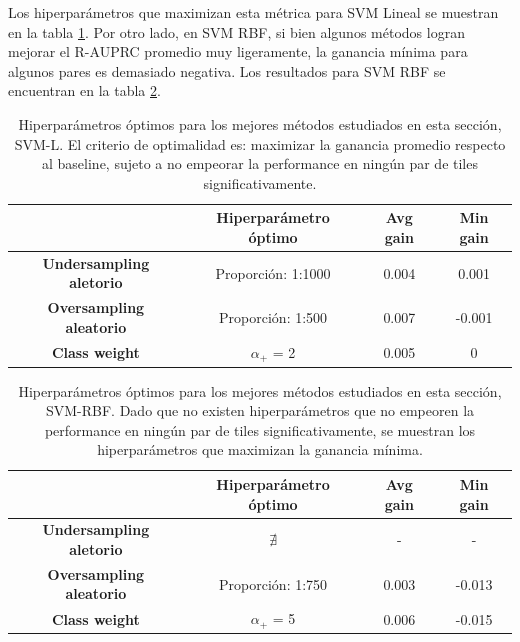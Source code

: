 Los hiperparámetros que maximizan esta métrica para SVM Lineal se muestran en la tabla \ref{tab:best_hyp_svml}. Por otro lado, en SVM RBF, si bien algunos métodos logran mejorar el R-AUPRC promedio muy ligeramente, la ganancia mínima para algunos pares es demasiado negativa. Los resultados para SVM RBF se encuentran en la tabla \ref{tab:best_hyp_svmk}. 


\begin{table}[ht]
\centering
\begin{tabular}{c|c|c|c|}
\cline{2-4}
\textbf{}                                             & \textbf{Hiperparámetro óptimo} & \textbf{Avg gain} & \textbf{Min gain} \\ \hline
\multicolumn{1}{|c|}{\textbf{Undersampling aletorio}} & Proporción: 1:1000       & 0.004             & 0.001            \\ \hline
\multicolumn{1}{|c|}{\textbf{Oversampling aleatorio}} & Proporción: 1:500        & 0.007             & -0.001            \\ \hline
\multicolumn{1}{|c|}{\textbf{Class weight}}           & $\alpha_+$ = 2           & 0.005             & 0            \\ \hline
\end{tabular}
\caption{Hiperparámetros óptimos para los mejores métodos estudiados en esta sección, SVM-L. El criterio de optimalidad es: maximizar la ganancia promedio respecto al baseline, sujeto a no empeorar la performance en ningún par de tiles significativamente.}
\label{tab:best_hyp_svml}
\end{table}

 
\begin{table}[ht]
\centering
\begin{tabular}{c|c|c|c|}
\cline{2-4}
\textbf{}                                             & \textbf{Hiperparámetro óptimo} & \textbf{Avg gain} & \textbf{Min gain} \\ \hline
\multicolumn{1}{|c|}{\textbf{Undersampling aletorio}} &  $\nexists$       &  -       &  - \\ \hline
\multicolumn{1}{|c|}{\textbf{Oversampling aleatorio}} & Proporción: 1:750        &  0.003       & -0.013 \\ \hline
\multicolumn{1}{|c|}{\textbf{Class weight}}           & $\alpha_+$ = 5    & 0.006     & -0.015             \\ \hline
\end{tabular}
\caption{Hiperparámetros óptimos para los mejores métodos estudiados en esta sección, SVM-RBF. Dado que no existen hiperparámetros que no empeoren la performance en ningún par de tiles significativamente, se muestran los hiperparámetros que maximizan la ganancia mínima. }
\label{tab:best_hyp_svmk}
\end{table}

